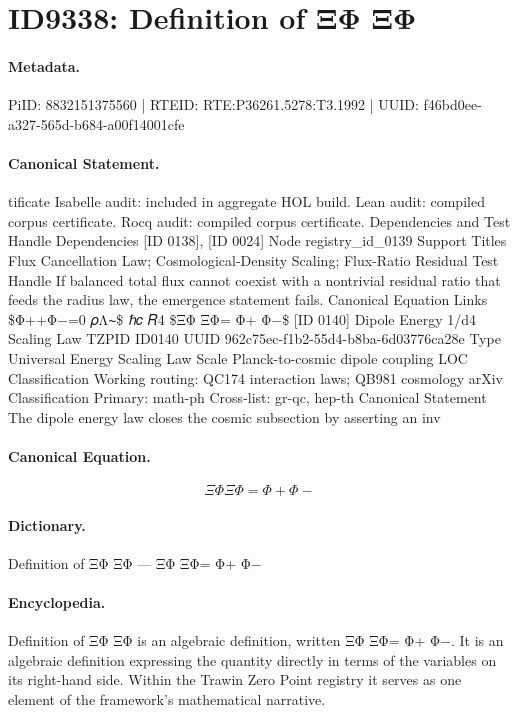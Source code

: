 \section*{ID9338: Definition of ΞΦ ΞΦ}
\paragraph{Metadata.}
PiID: 8832151375560 | RTEID: RTE:P36261.5278:T3.1992 | UUID: f46bd0ee-a327-565d-b684-a00f14001cfe

\paragraph{Canonical Statement.}
tificate Isabelle audit: included in aggregate HOL build. Lean audit: compiled corpus certificate. Rocq audit: compiled corpus certificate. Dependencies and Test Handle Dependencies [ID 0138], [ID 0024] Node registry\_id\_0139 Support Titles Flux Cancellation Law; Cosmological-Density Scaling; Flux-Ratio Residual Test Handle If balanced total flux cannot coexist with a nontrivial residual ratio that feeds the radius law, the emergence statement fails. Canonical Equation Links \$Φ++Φ−=0 𝜌Λ∼\$ ℏ𝑐 𝑅4 \$ΞΦ ΞΦ= Φ+ Φ−\$ [ID 0140] Dipole Energy 1/d4 Scaling Law TZPID ID0140 UUID 962c75ec-f1b2-55d4-b8ba-6d03776ca28e Type Universal Energy Scaling Law Scale Planck-to-cosmic dipole coupling LOC Classification Working routing: QC174 interaction laws; QB981 cosmology arXiv Classification Primary: math-ph Cross-list: gr-qc, hep-th Canonical Statement The dipole energy law closes the cosmic subsection by asserting an inv

\paragraph{Canonical Equation.}
\[
ΞΦ ΞΦ= Φ+ Φ−
\]

\paragraph{Dictionary.}
Definition of ΞΦ ΞΦ — ΞΦ ΞΦ= Φ+ Φ−

\paragraph{Encyclopedia.}
Definition of ΞΦ ΞΦ is an algebraic definition, written ΞΦ ΞΦ= Φ+ Φ−. It is an algebraic definition expressing the quantity directly in terms of the variables on its right-hand side. Within the Trawin Zero Point registry it serves as one element of the framework's mathematical narrative.
